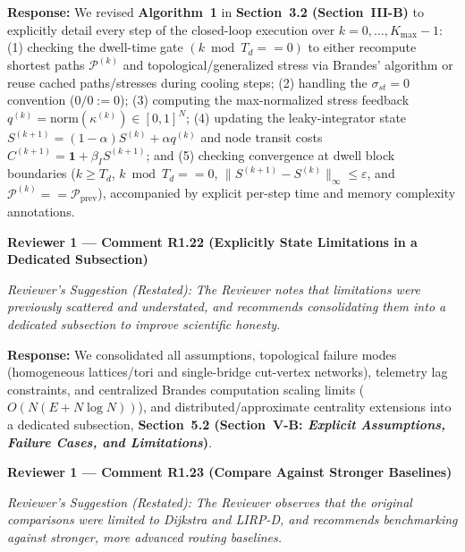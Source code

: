 \documentclass[11pt,a4paper]{article}
\newcommand{\cbox}[2]{%
  \vspace{0.6em}\noindent\textbf{#1}\par\smallskip
  \noindent\textit{Reviewer's Suggestion (Restated):} \textit{#2}\par\smallskip
}
\begin{document}
\noindent\textbf{Response:} We revised \textbf{Algorithm~1} in \textbf{Section~3.2 (Section~III-B)} to explicitly detail every step of the closed-loop execution over $k = 0, \dots, K_{\max}-1$: (1) checking the dwell-time gate $(k \bmod T_d == 0)$ to either recompute shortest paths $\mathcal{P}^{(k)}$ and topological/generalized stress via Brandes' algorithm or reuse cached paths/stresses during cooling steps; (2) handling the $\sigma_{st}=0$ convention ($0/0 := 0$); (3) computing the max-normalized stress feedback $q^{(k)} = \mathrm{norm}(\kappa^{(k)}) \in [0,1]^N$; (4) updating the leaky-integrator state $S^{(k+1)} = (1-\alpha)S^{(k)} + \alpha q^{(k)}$ and node transit costs $C^{(k+1)} = \mathbf{1} + \beta_I S^{(k+1)}$; and (5) checking convergence at dwell block boundaries ($k \ge T_d$, $k \bmod T_d == 0$, $\|S^{(k+1)}-S^{(k)}\|_\infty \le \varepsilon$, and $\mathcal{P}^{(k)} == \mathcal{P}_{\text{prev}}$), accompanied by explicit per-step time and memory complexity annotations.

\hrulefill

\cbox{Reviewer 1 --- Comment R1.22 (Explicitly State Limitations in a Dedicated Subsection)}{The Reviewer notes that limitations were previously scattered and understated, and recommends consolidating them into a dedicated subsection to improve scientific honesty.}

\noindent\textbf{Response:} We consolidated all assumptions, topological failure modes (homogeneous lattices/tori and single-bridge cut-vertex networks), telemetry lag constraints, and centralized Brandes computation scaling limits ($O(N(E+N\log N))$), and distributed/approximate centrality extensions into a dedicated subsection, \textbf{Section~5.2 (Section~V-B: \textit{Explicit Assumptions, Failure Cases, and Limitations})}.

\hrulefill

\cbox{Reviewer 1 --- Comment R1.23 (Compare Against Stronger Baselines)}{The Reviewer observes that the original comparisons were limited to Dijkstra and LIRP-D, and recommends benchmarking against stronger, more advanced routing baselines.}
\end{document}
